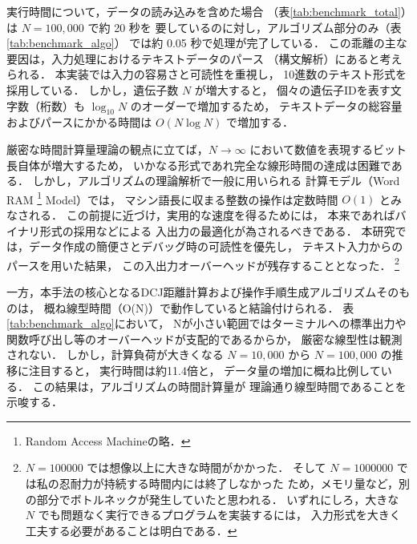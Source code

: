 \documentclass[paper=a4,fontsize=11pt,report,oneside]{jlreq}
\begin{document}
実行時間について，データの読み込みを含めた場合
（表\ref{tab:benchmark_total}）は $N=100,000$ で約 20 秒を
要しているのに対し，アルゴリズム部分のみ（表\ref{tab:benchmark_algo}）
では約 0.05 秒で処理が完了している．
この乖離の主な要因は，入力処理におけるテキストデータのパース
（構文解析）にあると考えられる．
本実装では入力の容易さと可読性を重視し，
10進数のテキスト形式を採用している．
しかし，遺伝子数 $N$ が増大すると，
個々の遺伝子IDを表す文字数（桁数）も $\log_{10} N$ のオーダーで増加するため，
テキストデータの総容量およびパースにかかる時間は
$O(N \log N)$ で増加する．

厳密な時間計算量理論の観点に立てば，$N \to \infty$
において数値を表現するビット長自体が増大するため，
いかなる形式であれ完全な線形時間の達成は困難である．
しかし，アルゴリズムの理論解析で一般に用いられる
計算モデル（Word RAM
\footnote{
    Random Access Machineの略．
}
 Model）では，
マシン語長に収まる整数の操作は定数時間 $O(1)$ とみなされる．
この前提に近づけ，実用的な速度を得るためには，
本来であればバイナリ形式の採用などによる
入出力の最適化が為されるべきである．
本研究では，データ作成の簡便さとデバッグ時の可読性を優先し，
テキスト入力からのパースを用いた結果，
この入出力オーバーヘッドが残存することとなった．
\footnote{
    $N = 100000$ では想像以上に大きな時間がかかった．
    そして $N = 1000000$ では私の忍耐力が持続する時間内には終了しなかった
    ため，メモリ量など，別の部分でボトルネックが発生していたと思われる．
    いずれにしろ，大きな $N$ でも問題なく実行できるプログラムを実装するには，
    入力形式を大きく工夫する必要があることは明白である．
}

一方，本手法の核心となるDCJ距離計算および操作手順生成アルゴリズムそのものは，
概ね線型時間（O(N)）で動作していると結論付けられる．
表\ref{tab:benchmark_algo}において，
Nが小さい範囲ではターミナルへの標準出力や
関数呼び出し等のオーバーヘッドが支配的であるからか，
厳密な線型性は観測されない．
しかし，計算負荷が大きくなる $N = 10,000$ から
$N = 100,000$ の推移に注目すると，
実行時間は約11.4倍と，
データ量の増加に概ね比例している．
この結果は，アルゴリズムの時間計算量が
理論通り線型時間であることを示唆する．

\newpage
\end{document}
